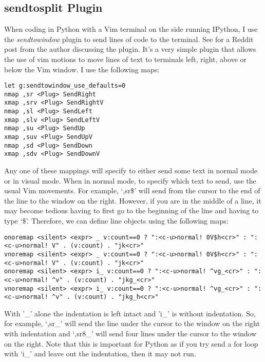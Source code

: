 \documentclass[10pt]{article}
\begin{document}
\subsection{sendtosplit Plugin}
When coding in Python with a Vim terminal on the side running IPython, I use the \textit{sendtowindow} plugin
\cite{KKPMW2016send} to send lines of code to the terminal. See \cite{KKPMW2019send} for a Reddit post from the author
discussing the plugin. It's a very simple plugin that allows the use of vim motions to move lines of text to terminals
left, right, above or below the Vim window. I use the following maps:\\
\begin{lstlisting}
let g:sendtowindow_use_defaults=0
nmap ,sr <Plug> SendRight
xmap ,srv <Plug> SendRightV
nmap ,sl <Plug> SendLeft
xmap ,slv <Plug> SendLeftV
nmap ,su <Plug> SendUp
xmap ,suv <Plug> SendUpV
nmap ,sd <Plug> SendDown
xmap ,sdv <Plug> SendDownV
\end{lstlisting}
Any one of these mappings will specify to either send some text in normal mode or in visual mode. When in normal mode,
to specify which text to send, use the usual Vim movements. For example, `,sr\$' will send from the cursor to the end
of the line to the window on the right. However, if you are in the middle of a line, it may become tedious having to
first go to the beginning of the line and having to type `\$'. Therefore, we can define line objects using the
following maps:
\begin{lstlisting}
onoremap <silent> <expr> _ v:count==0 ? ":<c-u>normal! 0V$h<cr>" : ":<c-u>normal! V" . (v:count) . "jk<cr>"
vnoremap <silent> <expr> _ v:count==0 ? ":<c-u>normal! 0V$h<cr>" : ":<c-u>normal! V" . (v:count) . "jk<cr>"
onoremap <silent> <expr> i_ v:count==0 ? ":<c-u>normal! ^vg_<cr>" : ":<c-u>normal! ^v" . (v:count) . "jkg_<cr>"
vnoremap <silent> <expr> i_ v:count==0 ? ":<c-u>normal! ^vg_<cr>" : ":<c-u>normal! ^v" . (v:count) . "jkg_h<cr>"
\end{lstlisting}
With '\_' alone the indentation is left intact and 'i\_' is without indentation. So, for example, `,sr\_' will send
the line under the cursor to the window on the right with indentation and `,sr8\_' will send four lines under the
cursor to the window on the right. Note that this is important for Python as if you try send a for loop with `i\_' and
leave out the indentation, then it may not run.

\end{document}
